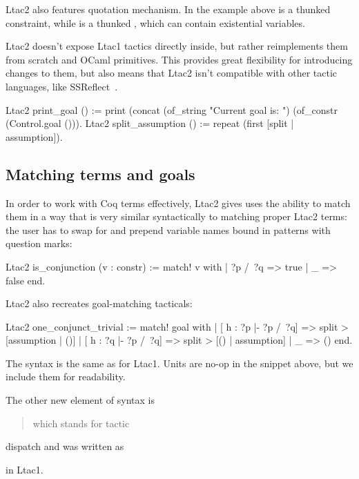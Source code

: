 Ltac2 also features quotation mechanism.
In the example above  is a thunked constraint, while  is a thunked , which can contain existential variables.

Ltac2 doesn't expose Ltac1 tactics directly inside, but rather reimplements them from scratch and OCaml primitives.
This provides great flexibility for introducing changes to them, but also means that Ltac2 isn't compatible with other tactic languages, like SSReflect~\cite[Section~3.1.3]{thecoqdevelopmentteamCoqProofAssistant2020}.

\begin{coq}
Ltac2 print_goal () := print (concat (of_string "Current goal is: ")
                                     (of_constr (Control.goal ())).
Ltac2 split_assumption () := repeat (first [split | assumption]).
\end{coq}

\subsection{Matching terms and goals}
\label{sec:matching-terms}

In order to work with Coq terms effectively, Ltac2 gives uses the ability to match them in a way that is very similar syntactically to matching proper Ltac2 terms: the user has to swap  for  and prepend variable names bound in patterns with question marks:
\begin{coq}
Ltac2 is_conjunction (v : constr) := match! v with
  | ?p /\ ?q => true
  | _ => false
  end.
\end{coq}

Ltac2 also recreates goal-matching tacticals:
\begin{coq}
Ltac2 one_conjunct_trivial :=
  match! goal with
  | [ h : ?p |- ?p /\ ?q] => split > [assumption | ()]
  | [ h : ?q |- ?p /\ ?q] => split > [() | assumption]
  | _ => ()
  end.
\end{coq}

The syntax is the same as for Ltac1. Units \coqe{()} are no-op in the snippet above, but we include them for readability.

The other new element of syntax is
\begin{quote}
 which stands for tactic \end{quote}
dispatch and was written as
\begin{quote}
\end{quote}
in Ltac1.

